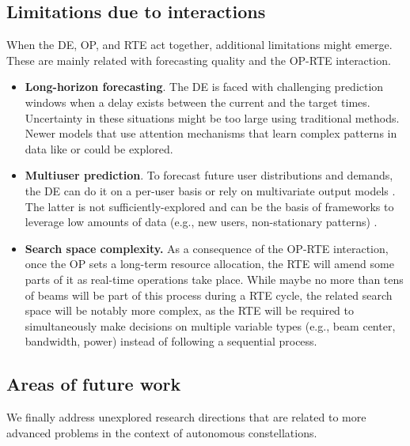 \documentclass[letterpaper]{article} %
\begin{document}
\subsection{Limitations due to interactions}
When the DE, OP, and RTE act together, additional limitations might emerge. These are mainly related with forecasting quality and the OP-RTE interaction.
\begin{itemize}
    \item \textbf{Long-horizon forecasting}. The DE is faced with challenging prediction windows when a delay exists between the current and the target times. Uncertainty in these situations might be too large using traditional methods. Newer models that use attention mechanisms that learn complex patterns in data like \cite{Li2019} or \cite{Wu2020DeepCase} could be explored.
    
    \item \textbf{Multiuser prediction}. To forecast future user distributions and demands, the DE can do it on a per-user basis or rely on multivariate output models \cite{CharkrabortyKishanMehrotra1990ForecastingNetworks, Wan2019MultivariateForecasting}. The latter is not sufficiently-explored and can be the basis of frameworks to leverage low amounts of data (e.g., new users, non-stationary patterns) \cite{Yu2016TemporalPrediction}.
    
    \item \textbf{Search space complexity.} As a consequence of the OP-RTE interaction, once the OP sets a long-term resource allocation, the RTE will amend some parts of it as real-time operations take place. While maybe no more than tens of beams will be part of this process during a RTE cycle, the related search space will be notably more complex, as the RTE will be required to simultaneously make decisions on multiple variable types (e.g., beam center, bandwidth, power) instead of following a sequential process.  
    
\end{itemize}


\subsection{Areas of future work}
We finally address unexplored research directions that are related to more advanced problems in the context of autonomous constellations.
\end{document}

